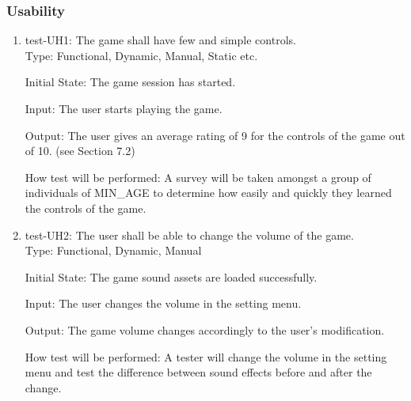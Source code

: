\documentclass[12pt, titlepage]{article}
\begin{document}
\subsubsection{Usability}
\begin{enumerate}
\item {test-UH1: The game shall have few and simple controls.\\}
Type: Functional, Dynamic, Manual, Static etc.
					
Initial State: The game session has started.
					
Input: The user starts playing the game.
					
Output: The user gives an average rating of 9 for the controls of the game out of 10. (see Section 7.2)
					
How test will be performed: A survey will be taken amongst a group of individuals of MIN\_AGE to determine how easily and quickly they learned the controls of the game. 

\item {test-UH2: The user shall be able to change the volume of the game.\\}
Type: Functional, Dynamic, Manual
					
Initial State: The game sound assets are loaded successfully.

Input: The user changes the volume in the setting menu.
					
Output: The game volume changes accordingly to the user's modification.
					
How test will be performed: A tester will change the volume in the setting menu and test the difference between sound effects before and after the change.

\end{enumerate}
\end{document}
